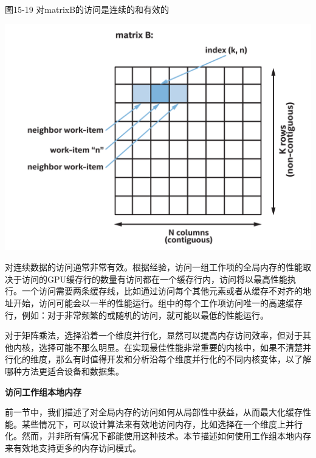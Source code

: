 \hspace*{\fill} \par %
图15-19 对matrixB的访问是连续的和有效的
\begin{center}
	\includegraphics[width=1.0\textwidth]{content/chapter-15/images/14}
\end{center}

对连续数据的访问通常非常有效。根据经验，访问一组工作项的全局内存的性能取决于访问的GPU缓存行的数量有访问都在一个缓存行内，访问将以最高性能执行。一个访问需要两条缓存线，比如通过访问每个其他元素或者从缓存不对齐的地址开始，访问可能会以一半的性能运行。组中的每个工作项访问唯一的高速缓存行，例如：对于非常频繁的或随机的访问，就可能以最低的性能运行。\par

\begin{tcolorbox}[colback=blue!5!white,colframe=blue!75!black, title=设置内核变体]
对于矩阵乘法，选择沿着一个维度并行化，显然可以提高内存访问效率，但对于其他内核，选择可能不那么明显。在实现最佳性能非常重要的内核中，如果不清楚并行化的维度，那么有时值得开发和分析沿每个维度并行化的不同内核变体，以了解哪种方法更适合设备和数据集。
\end{tcolorbox}

\hspace*{\fill} \par %
\textbf{访问工作组本地内存}

前一节中，我们描述了对全局内存的访问如何从局部性中获益，从而最大化缓存性能。某些情况下，可以设计算法来有效地访问内存，比如选择在一个维度上并行化。然而，并非所有情况下都能使用这种技术。本节描述如何使用工作组本地内存来有效地支持更多的内存访问模式。\par

